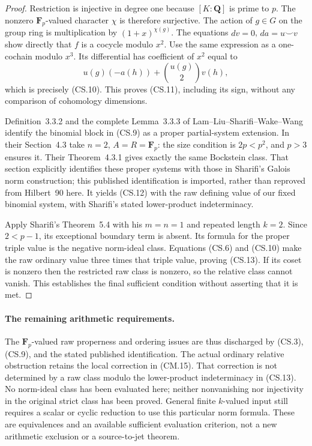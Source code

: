 \begin{proof}
Restriction is injective in degree one because
\([K:\mathbf Q]\) is prime to \(p\).  The nonzero
\(\mathbf F_p\)-valued character \(\chi\) is therefore
surjective.  The action of \(g\in G\) on the group
ring is multiplication by \((1+x)^{\chi(g)}\).
The equations \(dv=0\), \(da=u\smile v\) show
directly that \(f\) is a cocycle modulo \(x^2\).
Use the same expression as a one-cochain modulo \(x^3\).
Its differential has coefficient of \(x^2\) equal to
\[
 u(g)(-a(h))+\binom{u(g)}2v(h),
                                                               \tag{CS.14}
\]
which is precisely (CS.10).  This proves (CS.11),
including its sign, without any comparison of
cohomology dimensions.

Definition~3.3.2 and the complete Lemma~3.3.3 of
Lam--Liu--Sharifi--Wake--Wang identify the binomial
block in (CS.9) as a proper partial-system extension.
In their Section~4.3 take \(n=2\), \(A=R=\mathbf F_p\):
the size condition is \(2p<p^2\), and \(p>3\)
ensures it.  Their Theorem~4.3.1 gives exactly the
same Bockstein class.  That section explicitly
identifies these proper systems with those in
Sharifi's Galois norm construction; this published
identification is imported, rather than reproved
from Hilbert~90 here.  It yields (CS.12) with the
raw defining value of our fixed binomial system,
with Sharifi's stated lower-product indeterminacy.

Apply Sharifi's Theorem~5.4 with his \(m=n=1\)
and repeated length \(k=2\).  Since \(2<p-1\),
its exceptional boundary term is absent.  Its
formula for the proper triple value is the
negative norm-ideal class.  Equations (CS.6)
and (CS.10) make the raw ordinary value three
times that triple value, proving (CS.13).
If its coset is nonzero then the restricted raw
class is nonzero, so the relative class cannot
vanish.  This establishes the final sufficient
condition without asserting that it is met.
\end{proof}

\paragraph{The remaining arithmetic requirements.}
The \(\mathbf F_p\)-valued raw properness and ordering
issues are thus discharged by (CS.3), (CS.9), and
the stated published identification.  The actual
ordinary relative obstruction retains the local
correction in (CM.15).  That correction is not
determined by a raw class modulo the lower-product
indeterminacy in (CS.13).  No norm-ideal class has
been evaluated here; neither nonvanishing nor
injectivity in the original strict class has been
proved.  General finite \(k\)-valued input still
requires a scalar or cyclic reduction to use this
particular norm formula.  These are equivalences
and an available sufficient evaluation criterion,
not a new arithmetic exclusion or a source-to-jet
theorem.

